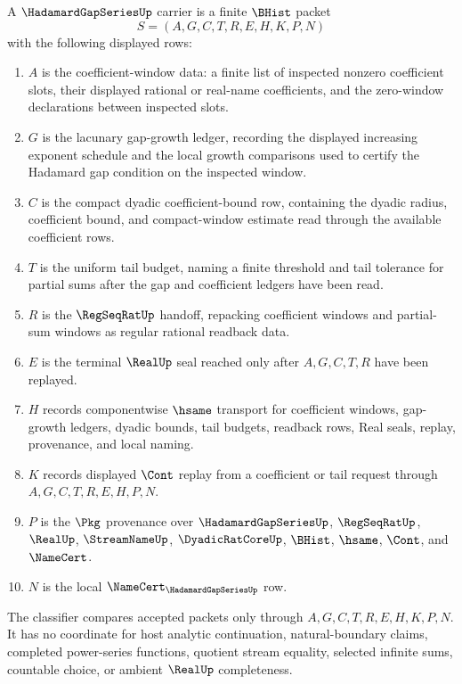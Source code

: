 \begin{definition}
\label{def:hadamard-gap-series-carrier}
A $\HadamardGapSeriesUp$ carrier is a finite $\BHist$ packet
$$
S=(A,G,C,T,R,E,H,K,P,N)
$$
with the following displayed rows:
\begin{enumerate}
\item $A$ is the coefficient-window data: a finite list of inspected nonzero coefficient slots, their displayed rational or real-name coefficients, and the zero-window declarations between inspected slots.
\item $G$ is the lacunary gap-growth ledger, recording the displayed increasing exponent schedule and the local growth comparisons used to certify the Hadamard gap condition on the inspected window.
\item $C$ is the compact dyadic coefficient-bound row, containing the dyadic radius, coefficient bound, and compact-window estimate read through the available coefficient rows.
\item $T$ is the uniform tail budget, naming a finite threshold and tail tolerance for partial sums after the gap and coefficient ledgers have been read.
\item $R$ is the $\RegSeqRatUp$ handoff, repacking coefficient windows and partial-sum windows as regular rational readback data.
\item $E$ is the terminal $\RealUp$ seal reached only after $A,G,C,T,R$ have been replayed.
\item $H$ records componentwise $\hsame$ transport for coefficient windows, gap-growth ledgers, dyadic bounds, tail budgets, readback rows, Real seals, replay, provenance, and local naming.
\item $K$ records displayed $\Cont$ replay from a coefficient or tail request through $A,G,C,T,R,E,H,P,N$.
\item $P$ is the $\Pkg$ provenance over $\HadamardGapSeriesUp$, $\RegSeqRatUp$, $\RealUp$, $\StreamNameUp$, $\DyadicRatCoreUp$, $\BHist$, $\hsame$, $\Cont$, and $\NameCert$.
\item $N$ is the local $\NameCert_{\HadamardGapSeriesUp}$ row.
\end{enumerate}
The classifier compares accepted packets only through $A,G,C,T,R,E,H,K,P,N$. It has no coordinate for host analytic continuation, natural-boundary claims, completed power-series functions, quotient stream equality, selected infinite sums, countable choice, or ambient $\RealUp$ completeness.
\end{definition}

